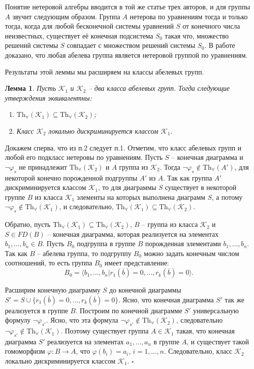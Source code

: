 \documentclass[a4paper,11pt,twoside]{article}
\newtheorem{lemma}{Лемма}[section]
\def\proof{{\noindent{\bf Доказательство.}} }
\def\K{{\mathcal{K}}}
\def\Tha{{\mathrm{Th}_\forall}}
\begin{document}
Понятие нетеровой алгебры вводится в той же статье трех авторов, и для группы $A$ звучит следующим образом. Группа $A$ нетерова по уравнениям тогда и только тогда, когда для любой бесконечной системы уравнений $S$ от конечного числа неизвестных, существует её конечная подсистема $S_0$ такая что, множество решений системы $S$ совпадает с множеством решений системы $S_0$. В работе \cite{DMR2} доказано, что любая абелева группа является нетеровой группой по уравнениям.

Результаты этой леммы мы расширяем на классы абелевых групп.

\begin{lemma}\label{lemma:UnivEquivForClass}
Пусть $\K_1$ и $\K_2$ -- два класса абелевых групп. Тогда следующие утверждения эквивалентны:
\begin{enumerate}
\item $\Tha(\K_1) \subseteq \Tha(\K_2)$;
\item Класс $\K_2$ локально дискриминируется классом $\K_1$.
\end{enumerate}
\end{lemma}

\proof Докажем сперва, что из п.2 следует п.1. Отметим, что класс абелевых групп и любой его подкласс нетеровы по уравнениям. Пусть $S$ -- конечная диаграмма и $\neg \varphi_s$ не принадлежит $\Tha(\K_2)$ и $A$ группа из $\K_2$. Тогда $\neg \varphi_s \notin \Tha(A')$, для некоторой конечно порожденной подгруппы $A'$ из $A$. Так как группа $A'$ дискриминируется классом $\K_1$, то для диаграммы $S$ существует в некоторой группе $B$ из класса $\K_1$ элементы на которых выполнена диаграмм $S$, а потому $\neg \varphi_s \notin \Tha(\K_1)$, и следовательно, $\Tha(\K_1) \subseteq \Tha(\K_2)$.

Обратно, пусть $\Tha(\K_1) \subseteq \Tha(\K_2)$, $B$ -- группа из класса $\K_2$ и $S \in FD(B)$ -- конечная диаграмма, которая реализуется на элементах $b_1, \ldots, b_n \in B$. Пусть $B_0$ подгруппа в группе $B$ порожденная элементами $b_1, \ldots, b_n$. Так как $B$ -- абелева группа, то подгруппу $B_0$ можно задать конечным числом соотношений, то есть группа $B_0$ имеет представление:
 $$B_0 = \langle b_1, \ldots, b_n | r_1(\overline{b}) = 0, \ldots, r_k(\overline{b}) = 0 \rangle.$$

Расширим конечную диаграмму $S$ до конечной диаграммы $S' = S \cup \{r_1(\overline{b}) = 0, \ldots, r_k(\overline{b}) = 0\}$. Ясно, что конечная диаграмма $S'$ так же реализуется в группе $B$. Построим по конечной диаграмме $S'$ универсальную формулу $\neg\varphi_{s'}$. Ясно, что эта формула $\neg\varphi_{s'} \notin \Tha(\K_2)$, следовательно $\neg\varphi_{s'} \notin \Tha(\K_1)$. Поэтому существует группа $A \in \K_1$ такая, что конечная диаграмма $S'$ реализуется на элементах $a_1, \ldots, a_n$ в группе $A$, и существует такой гомоморфизм $\varphi: B \rightarrow A$, что $\varphi(b_i) = a_i$, $i = 1, \ldots, n$. Следовательно, класс $\K_2$ локально дискриминируется классом $\K_1$. $\square$
\end{document}
